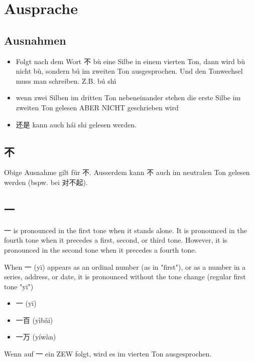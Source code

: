 \documentclass[UTF8]{ctexart}
\begin{document}


\section{Ausprache}

\subsection{Ausnahmen}

\begin{itemize}
    \item Folgt nach dem Wort 不 bù eine Silbe in einem vierten Ton, dann wird bù nicht bù,
    sondern bú im zweiten Ton ausgesprochen. Und den Tonwechsel muss man
    schreiben. Z.B. bú shì
    \item wenn zwei Silben im dritten Ton nebeneinander stehen die erste Silbe im zweiten
    Ton gelesen ABER NICHT geschrieben wird
    \item 还是 kann auch hái shi gelesen werden.
\end{itemize}

\subsection{不}

Obige Ausnahme gilt für 不. Ausserdem kann 不 auch im neutralen Ton gelesen werden (bspw. bei 对不起).

\subsection{一}

一 is pronounced in the first tone when it stands alone. It is pronounced in the fourth tone when it precedes a first, second, or third tone. However, it is pronounced in the second tone when it precedes a fourth tone.

When 一 (yī) appears as an ordinal number (as in "first"), or as a number in a series, address, or date, it is pronounced without the tone change (regular first tone "yī")

\begin{itemize}
    \item 一 (yī)
    \item 一百 (yìbǎi)
    \item 一万 (yíwàn)
\end{itemize}

Wenn auf 一 ein ZEW folgt, wird es im vierten Ton ausgesprochen.
\end{document}
